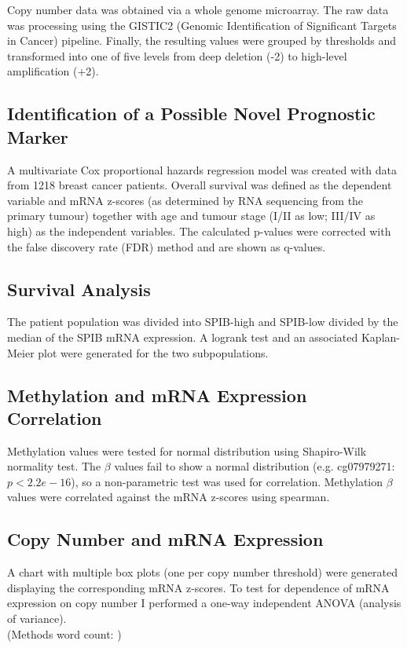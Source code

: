 Copy number data was obtained via a whole genome microarray.
The raw data was processing using the GISTIC2 (Genomic Identification of Significant Targets in Cancer) pipeline.
Finally, the resulting values were grouped by thresholds and transformed into one of five levels from deep deletion (-2) to high-level amplification (+2).

\subsection{Identification of a Possible Novel Prognostic Marker}

A multivariate Cox proportional hazards regression model was created with data from 1218 breast cancer patients.
Overall survival was defined as the dependent variable and mRNA z-scores (as determined by RNA sequencing from the primary tumour) together with age and tumour stage (I/II as low; III/IV as high) as the independent variables.
The calculated p-values were corrected with the false discovery rate (FDR) method and are shown as q-values.

\subsection{Survival Analysis}

The patient population was divided into SPIB-high and SPIB-low divided by the median of the SPIB mRNA expression.
A logrank test and an associated Kaplan-Meier plot were generated for the two subpopulations.

\subsection{Methylation and mRNA Expression Correlation}

Methylation values were tested for normal distribution using Shapiro-Wilk normality test.
The $\beta$ values fail to show a normal distribution (e.g. cg07979271: ${p < 2.2e-16}$), so a non-parametric test was used for correlation.
Methylation $\beta$ values were correlated against the mRNA z-scores using spearman.


\subsection{Copy Number and mRNA Expression}

A chart with multiple box plots (one per copy number threshold) were generated displaying the corresponding mRNA z-scores.
To test for dependence of mRNA expression on copy number I performed a one-way independent ANOVA (analysis of variance).
\\
\endcountem
(Methods word count: \thewordcount{})